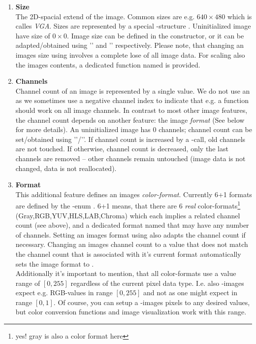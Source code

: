 \begin{enumerate}

\item \textbf{Size}
\\The 2D-spacial extend of the image. Common sizes are e.g. $640 \times{} 480$ which is calles \emph{VGA}. Sizes are represented by a special -structure . Uninitialized image have size of $0 \times{} 0$. Image size can be defined in the constructor, or it can be adapted/obtained using '' and '' respectively. Please note, that changing an images size using  involves a complete lose of all image data. For scaling also the images contents, a dedicated function named  is provided. 
\item \textbf{Channels}\\
 Channel count of an image is represented by a single  value. We do not use an  as we sometimes use a negative channel index to indicate that e.g. a function should work on all image channels. In contrast to most other image features, the channel count depends on another feature: the image \emph{format} (See below for more details). An uninitialized image has $0$ channels; channel count can be set/obtained using ''/''. If channel count is increased by a -call, old channels are not touched. If otherwise, channel count is decreased, only the last channels are removed -- other channels remain untouched (image data is not changed, data is not reallocated).

\item \textbf{Format}\\
This additional feature defines an images \emph{color-format}. Currently 6+1 formats are defined by the -enum . 6+1 means, that there are 6 \emph{real} color-formats\footnote{yes! gray is also a color format here} (Gray,RGB,YUV,HLS,LAB,Chroma) which each implies a related channel count (see above), and a dedicated format named  that may have any number of channels. Setting an images format using  also adapts the channel count if necessary. Changing an images channel count to a value that does not match the channel count that is associated with it's current format automatically sets the image format to .\\
Additionally it's important to mention, that all color-formats use a value range of $[0,255]$ regardless of the current pixel data type. I.e. also -images expect e.g. RGB-values in range $[0,255]$ and not as one might expect in range $[0,1]$. Of course, you can setup a -images pixels to any desired values, but color conversion functions  and image visualization work with this range.


\end{enumerate}
